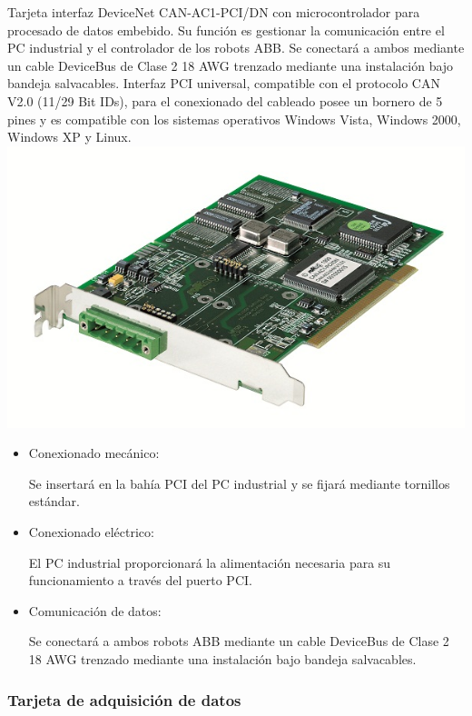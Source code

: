 	
		Tarjeta interfaz DeviceNet CAN-AC1-PCI/DN con microcontrolador para procesado de datos embebido. Su función es gestionar la comunicación entre el PC industrial y el controlador de los robots ABB. Se conectará a ambos mediante un cable DeviceBus de Clase 2 18 AWG trenzado mediante una instalación bajo bandeja salvacables. Interfaz PCI universal, compatible con el protocolo CAN V2.0 (11/29 Bit IDs), para el conexionado del cableado posee un bornero de 5 pines y es  compatible con los sistemas operativos Windows Vista, Windows 2000, Windows XP y Linux.\\

\includegraphics[width=1\textwidth]{Datasheets/10aFoto.jpg}

		\begin{itemize}
				\item{Conexionado mecánico:}
				
				Se insertará en la bahía PCI del PC industrial y se fijará mediante tornillos estándar.

				\item{Conexionado eléctrico:}

				El PC industrial proporcionará la alimentación necesaria para su funcionamiento a través del puerto PCI.
 				
				\item{Comunicación de datos:}
				
				Se conectará a ambos robots ABB mediante un cable DeviceBus de Clase 2 18 AWG trenzado mediante una instalación bajo bandeja salvacables.

		\end{itemize}

\newpage


	\subsubsection{Tarjeta de adquisición de datos}

